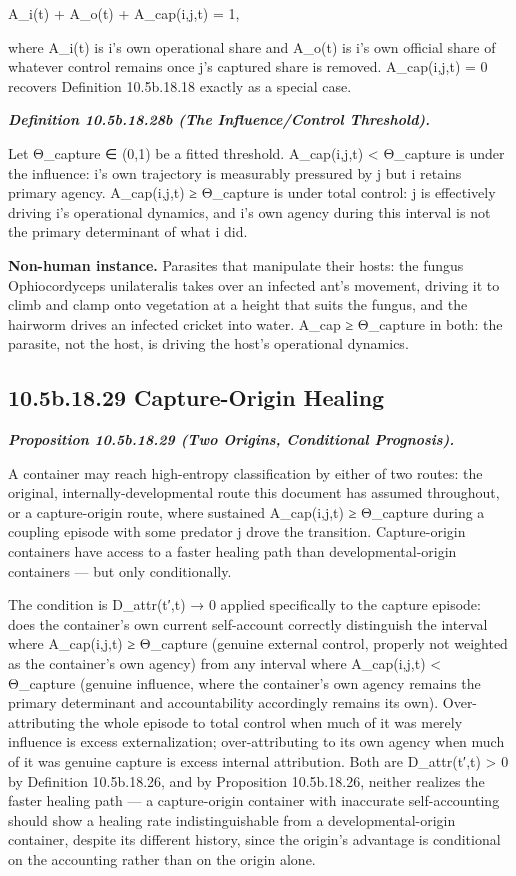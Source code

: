 \documentclass[
]{article}
\begin{document}
A\_i(t) + A\_o(t) + A\_cap(i,j,t) = 1,

where A\_i(t) is i's own operational share and A\_o(t) is i's own
official share of whatever control remains once j's captured share is
removed. A\_cap(i,j,t) = 0 recovers Definition 10.5b.18.18 exactly as a
special case.

\emph{\textbf{Definition 10.5b.18.28b (The Influence/Control
Threshold).}}

Let Θ\_capture ∈ (0,1) be a fitted threshold. A\_cap(i,j,t) \textless{}
Θ\_capture is under the influence: i's own trajectory is measurably
pressured by j but i retains primary agency. A\_cap(i,j,t) ≥ Θ\_capture
is under total control: j is effectively driving i's operational
dynamics, and i's own agency during this interval is not the primary
determinant of what i did.

\textbf{Non-human instance.} Parasites that manipulate their hosts: the
fungus Ophiocordyceps unilateralis takes over an infected ant's
movement, driving it to climb and clamp onto vegetation at a height that
suits the fungus, and the hairworm drives an infected cricket into
water. A\_cap ≥ Θ\_capture in both: the parasite, not the host, is
driving the host's operational dynamics.

\hypertarget{b.18.29-capture-origin-healing}{%
\subsection{10.5b.18.29 Capture-Origin
Healing}\label{b.18.29-capture-origin-healing}}

\emph{\textbf{Proposition 10.5b.18.29 (Two Origins, Conditional
Prognosis).}}

A container may reach high-entropy classification by either of two
routes: the original, internally-developmental route this document has
assumed throughout, or a capture-origin route, where sustained
A\_cap(i,j,t) ≥ Θ\_capture during a coupling episode with some predator
j drove the transition. Capture-origin containers have access to a
faster healing path than developmental-origin containers --- but only
conditionally.

The condition is D\_attr(t′,t) → 0 applied specifically to the capture
episode: does the container's own current self-account correctly
distinguish the interval where A\_cap(i,j,t) ≥ Θ\_capture (genuine
external control, properly not weighted as the container's own agency)
from any interval where A\_cap(i,j,t) \textless{} Θ\_capture (genuine
influence, where the container's own agency remains the primary
determinant and accountability accordingly remains its own).
Over-attributing the whole episode to total control when much of it was
merely influence is excess externalization; over-attributing to its own
agency when much of it was genuine capture is excess internal
attribution. Both are D\_attr(t′,t) \textgreater{} 0 by Definition
10.5b.18.26, and by Proposition 10.5b.18.26, neither realizes the faster
healing path --- a capture-origin container with inaccurate
self-accounting should show a healing rate indistinguishable from a
developmental-origin container, despite its different history, since the
origin's advantage is conditional on the accounting rather than on the
origin alone.
\end{document}

